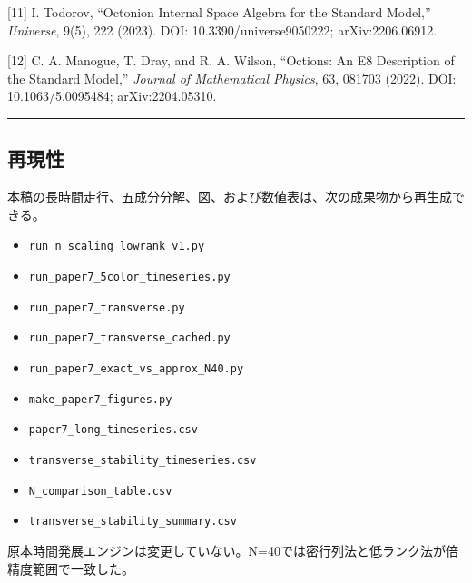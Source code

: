 \documentclass[
  a4paper,
]{ltjsarticle}
\providecommand{\tightlist}{%
  \setlength{\itemsep}{0pt}\setlength{\parskip}{0pt}}
\begin{document}
{[}11{]} I. Todorov, ``Octonion Internal Space Algebra for the Standard
Model,'' \emph{Universe}, 9(5), 222 (2023). DOI:
10.3390/universe9050222; arXiv:2206.06912.

{[}12{]} C. A. Manogue, T. Dray, and R. A. Wilson, ``Octions: An E8
Description of the Standard Model,'' \emph{Journal of Mathematical
Physics}, 63, 081703 (2022). DOI: 10.1063/5.0095484; arXiv:2204.05310.

\begin{center}\rule{0.5\linewidth}{0.5pt}\end{center}

\subsection{再現性}\label{ux518dux73feux6027}

本稿の長時間走行、五成分分解、図、および数値表は、次の成果物から再生成できる。

\begin{itemize}
\tightlist
\item
  \texttt{run\_n\_scaling\_lowrank\_v1.py}
\item
  \texttt{run\_paper7\_5color\_timeseries.py}
\item
  \texttt{run\_paper7\_transverse.py}
\item
  \texttt{run\_paper7\_transverse\_cached.py}
\item
  \texttt{run\_paper7\_exact\_vs\_approx\_N40.py}
\item
  \texttt{make\_paper7\_figures.py}
\item
  \texttt{paper7\_long\_timeseries.csv}
\item
  \texttt{transverse\_stability\_timeseries.csv}
\item
  \texttt{N\_comparison\_table.csv}
\item
  \texttt{transverse\_stability\_summary.csv}
\end{itemize}

原本時間発展エンジンは変更していない。N=40では密行列法と低ランク法が倍精度範囲で一致した。
\end{document}
